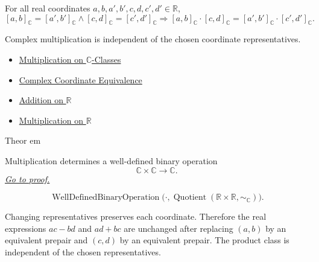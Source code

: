 \begin{remark*}
For all real coordinates $a,b,a',b',c,d,c',d'\in\mathbb{R}$,
\[
[a,b]_{\mathbb{C}}=[a',b']_{\mathbb{C}}
\land
[c,d]_{\mathbb{C}}=[c',d']_{\mathbb{C}}
\Longrightarrow
[a,b]_{\mathbb{C}}\cdot[c,d]_{\mathbb{C}}
=
[a',b']_{\mathbb{C}}\cdot[c',d']_{\mathbb{C}}.
\]
\end{remark*}

\begin{remark*}[Interpretation]
Complex multiplication is independent of the chosen coordinate
representatives.
\end{remark*}

\begin{dependencies}
\begin{itemize}
  \item \hyperref[def:multiplication-on-c-classes]{Multiplication on $\mathbb{C}$-Classes}
  \item \hyperref[def:complex-coordinate-equivalence]{Complex Coordinate Equivalence}
  \item \hyperref[def:addition-on-r]{Addition on $\mathbb{R}$}
  \item \hyperref[def:multiplication-on-r]{Multiplication on $\mathbb{R}$}
\end{itemize}
\end{dependencies}

\begin{theorembox}{Theor
em}
\begin{theorem}
\label{thm:multiplication-on-c-well-defined}
Multiplication determines a well-defined binary operation
\[
\mathbb{C}\times\mathbb{C}\to\mathbb{C}.
\]
\hyperref[prf:multiplication-on-c-well-defined]{\textit{Go to proof.}}
\end{theorem}
\end{theorembox}

\begin{remark*}
\[
\operatorname{WellDefinedBinaryOperation}
\bigl(\cdot, \operatorname{Quotient}(\mathbb{R}\times\mathbb{R},\sim_{\mathbb{C}})\bigr).
\]
\end{remark*}

\begin{remark*}[Interpretation]
Changing representatives preserves each coordinate. Therefore the real
expressions \(ac-bd\) and \(ad+bc\) are unchanged after replacing
\((a,b)\) by an equivalent prepair and \((c,d)\) by an equivalent prepair.
The product class is independent of the chosen representatives.
\end{remark*}

